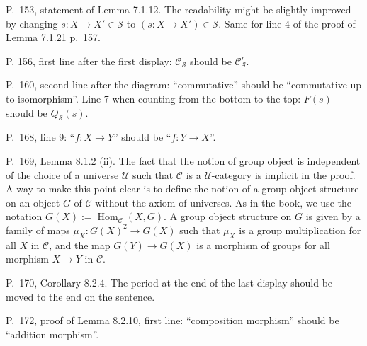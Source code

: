 \documentclass[12pt]{article}
\theoremstyle{remark}
\theoremstyle{definition}
\newcommand{\cc}{\mathcal}
\newcommand{\C}{\mathcal C}
\newcommand{\U}{\mathcal U}
\DeclareMathOperator{\Hom}{Hom}%
\begin{document}
\noindent P.~153, statement of Lemma 7.1.12. The readability might be slightly improved by changing $s:X\to X'\in\mathcal S$ to $(s:X\to X')\in\mathcal S$. Same for line 4 of the proof of Lemma 7.1.21 p.~157.

\noindent P. 156, first line after the first display: $\C_{\cc S}$ should be $\C_{\cc S}^r$. 

\noindent P.~160, second line after the diagram: ``commutative'' should be ``commutative up to isomorphism''. Line 7 when counting from the bottom to the top: $F(s)$ should be $Q_{\mathcal S}(s)$. 

\noindent P.~168, line 9: ``$f:X\to Y$'' should be ``$f:Y\to X$''. 

\noindent P.~169, Lemma 8.1.2 (ii). The fact that the notion of group object is independent of the choice of a universe $\U$ such that $\C$ is a $\U$-category is implicit in the proof. A way to make this point clear is to define the notion of a group object structure on an object $G$ of $\C$ without the axiom of universes. As in the book, we use the notation $G(X):=\Hom_\C(X,G)$. A group object structure on $G$ is given by a family of maps $\mu_X:G(X)^2\to G(X)$ such that $\mu_X$ is a group multiplication for all $X$ in $\C$, and the map $G(Y)\to G(X)$ is a morphism of groups for all morphism $X\to Y$ in $\C$. 


\noindent P.~170, Corollary 8.2.4. The period at the end of the last display should be moved to the end on the sentence.


\noindent P.~172, proof of Lemma 8.2.10, first line: ``composition morphism'' should be ``addition morphism''. 

\end{document}

